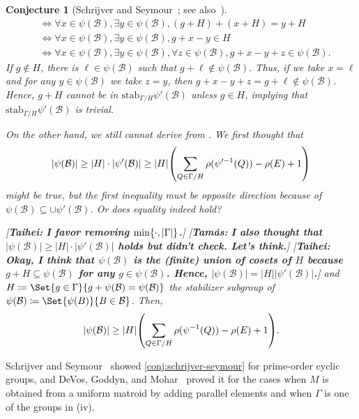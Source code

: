 \documentclass{article}
\DeclarePairedDelimiter{\prn}{(}{)}
\DeclarePairedDelimiter{\set}{\{}{\}}
\newtheorem{conjecture}[theorem]{Conjecture}
\theoremstyle{definition}
\newcommand{\onote}[1]{{\color{purple}[{\tiny \textbf{Taihei:} \bf #1}]\marginpar{\color{purple}*}}}
\newcommand{\snote}[1]{{\color{cyan}[{\tiny \textbf{Tamás:} \bf #1}]\marginpar{\color{cyan}*}}}
\newcommand{\onote}[1]{}
\newcommand{\snote}[1]{}
\begin{document}
\begin{conjecture}[{Schrijver and Seymour~\cite{schrijver1990spanning}}; see also~\cite{devos2009generalization}]
{\begin{align}
        &\iff \forall x \in \psi(\mathcal{B}), \exists y \in \psi(\mathcal{B}), (g + H) + (x + H) = y + H \\
        &\iff \forall x \in \psi(\mathcal{B}), \exists y \in \psi(\mathcal{B}), g + x - y \in H \\
        &\iff \forall x \in \psi(\mathcal{B}), \exists y \in \psi(\mathcal{B}), \forall z \in \psi(\mathcal{B}), g + x - y + z \in \psi(\mathcal{B}).
    \end{align}
If $g \notin H$, there is $\ell \in \psi(\mathcal{B})$ such that $g + \ell \notin \psi(\mathcal{B})$.
    Thus, if we take $x = \ell$ and for any $y \in \psi(\mathcal{B})$ we take $z = y$, then $g + x - y + z = g + \ell \notin \psi(\mathcal{B})$.
    Hence, $g + H$ cannot be in $\textrm{stab}_{\Gamma/H}\psi'(\mathcal{B})$ unless $g \in H$, implying that $\textrm{stab}_{\Gamma/H}\psi'(\mathcal{B})$ is trivial.

    On the other hand, we still cannot derive \cite[Conjecture~1.13]{devos2009generalization} from \cite[Conjecture~4.2]{schrijver1990spanning}.
    We first thought that
    \begin{align}
        | \psi(\mathcal{B}) |
        \ge |H| \cdot |\psi'(\mathcal{B})|
        \ge |H| \prn*{\sum_{Q \in \Gamma / H} \rho(\psi'^{-1}(Q)) - \rho(E) + 1}
    \end{align}
    might be true, but the first inequality must be opposite direction because of $\psi(\mathcal{B}) \subseteq \cup \psi'(\mathcal{B})$.
    Or does equality indeed hold?
    } 
    \onote{I favor removing $\min\set{\cdot, |\Gamma|}$.} \snote{I also thought that $|\psi(\mathcal{B})| \ge |H| \cdot |\psi'(\mathcal{B})|$ holds but didn't check. Let's think.}
    \onote{Okay, I think that $\psi(\mathcal{B})$ is the (finite) union of cosets of $H$ because $g + H \subseteq \psi(\mathcal{B})$ for any $g \in \psi(\mathcal{B})$. Hence, $|\psi(\mathcal{B})| = |H||\psi'(\mathcal{B})|$.}
    \fi
and $H \coloneqq \Set{g \in \Gamma}{g + \psi(\mathcal{B}) = \psi(\mathcal{B})}$ the stabilizer subgroup of $\psi(\mathcal{B}) \coloneqq \Set{\psi(B)}{B \in \mathcal{B}}$.
    Then,
\begin{align}
        |\psi(\mathcal{B})| \ge |H| \prn*{\sum_{Q \in \Gamma / H} \rho(\psi^{-1}(Q)) - \rho(E) + 1}.
    \end{align}
\end{conjecture}


Schrijver and Seymour~\cite{schrijver1990spanning} showed \cref{conj:schrijver-seymour} for prime-order cyclic groups, and
DeVos, Goddyn, and Mohar~\cite{devos2009generalization} proved it for the cases when $M$ is obtained from a uniform matroid by adding parallel elements and when $\Gamma$ is one of the groups in (iv).
\end{document}
